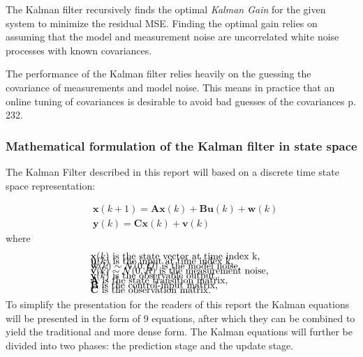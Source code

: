 The Kalman filter recursively finds the optimal \textit{Kalman Gain} for the given system to minimize the residual MSE. Finding the optimal gain relies on assuming that the model and measurement noise are uncorrelated white noise processes with known covariances. 

The performance of the Kalman filter relies heavily on the guessing the covariance of measurements and model noise. This means in practice that an online tuning of covariances is desirable to avoid bad guesses of the covariances \cite{Doraiswami2014} p. 232.

\subsubsection{Mathematical formulation of the Kalman filter in state space}
The Kalman Filter described in this report will based on a discrete time state space representation: 

\begin{align}
	&\textbf{x}(k+1) = \textbf{A}\textbf{x}(k) + \textbf{B}\textbf{u}(k) + \textbf{w}(k)  \label{eq:KalmanSystemEquations} \\
	&\textbf{y}(k) = \textbf{C}\textbf{x}(k)+\textbf{v}(k) 
\end{align}
where 
\begin{align*}
	&\text{$\textbf{x}(k)$ is the state vector at time index k,					}	\\[-1em]
	&\text{$\textbf{u}(k)$ is the input at time index k, 						}	\\[-1em]
	&\text{$\textbf{w}(k) \sim \mathcal{N}(0, Q)$ is the model noise,			}	\\[-1em]
	&\text{$\textbf{v}(k) \sim \mathcal{N}(0, R)$ is the measurement noise,		}	\\[-1em]
	&\text{$\textbf{y}(k)$ is the observable output, 							}	\\[-1em]
	&\text{\textbf{A} is the state transition matrix,							}	\\[-1em]
	&\text{\textbf{B} is the control-input matrix,								}	\\[-1em]
	&\text{\textbf{C} is the observation matrix. 								}	\\[-1em]
\end{align*}

To simplify the presentation for the readers of this report the Kalman equations will be presented in the form of 9 equations, after which they can be combined to yield the traditional and more dense form.
The Kalman equations will further be divided into two phases: the prediction stage and the update stage. 

